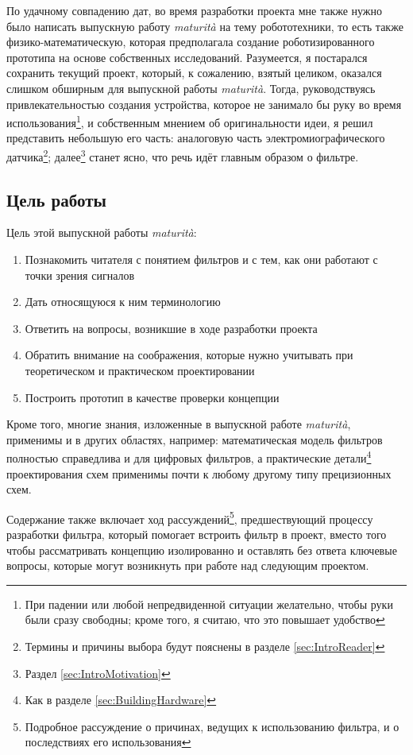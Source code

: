 \documentclass[a4paper, 10pt, final]{article} %
\begin{document}
    По удачному совпадению дат, во время разработки проекта мне также нужно было написать выпускную работу \emph{maturit\`{a}} на тему робототехники, то есть также физико-математическую, которая предполагала создание роботизированного прототипа на основе собственных исследований. Разумеется, я постарался сохранить текущий проект, который, к сожалению, взятый целиком, оказался слишком обширным для выпускной работы \emph{maturit\`{a}}. Тогда, руководствуясь привлекательностью создания устройства, которое не занимало бы руку во время использования\footnote{При падении или любой непредвиденной ситуации желательно, чтобы руки были сразу свободны; кроме того, я считаю, что это повышает удобство}, и собственным мнением об оригинальности идеи, я решил представить небольшую его часть: аналоговую часть электромиографического датчика\footnote{Термины и причины выбора будут пояснены в разделе \ref{sec:IntroReader}}; далее\footnote{Раздел \ref{sec:IntroMotivation}} станет ясно, что речь идёт главным образом о фильтре.
    
    \subsection{Цель работы}\label{sec:IntroAim}
    \noindent Цель этой выпускной работы \emph{maturit\`{a}}:
    \begin{enumerate}[label=\emph{(\roman*)}]
        \item Познакомить читателя с понятием фильтров и с тем, как они работают с точки зрения сигналов
        \item Дать относящуюся к ним терминологию
        \item Ответить на вопросы, возникшие в ходе разработки проекта
        \item Обратить внимание на соображения, которые нужно учитывать при теоретическом и практическом проектировании
        \item Построить прототип в качестве проверки концепции
    \end{enumerate}
    Кроме того, многие знания, изложенные в выпускной работе \emph{maturit\`{a}}, применимы и в других областях, например: математическая модель фильтров полностью справедлива и для цифровых фильтров, а практические детали\footnote{Как в разделе \ref{sec:BuildingHardware}}  проектирования схем применимы почти к любому другому типу прецизионных схем.
    
    Содержание также включает ход рассуждений\footnote{Подробное рассуждение о причинах, ведущих к использованию фильтра, и о последствиях его использования}, предшествующий процессу разработки фильтра, который помогает встроить фильтр в проект, вместо того чтобы рассматривать концепцию изолированно и оставлять без ответа ключевые вопросы, которые могут возникнуть при работе над следующим проектом.
    
\end{document}
